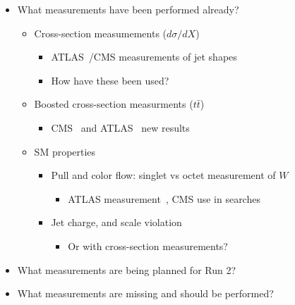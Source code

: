 \label{measurements}

\begin{itemize}
\item What measurements have been performed already?
\begin{itemize}
	\item Cross-section measumements ($d\sigma/ d X$)
	\begin{itemize}
		\item ATLAS~\cite{ATLAS-2010-Shapes}/CMS measurements of jet shapes
		\item How have these been used?
	\end{itemize}
	\item Boosted cross-section measurments ($t\bar{t}$)
	\begin{itemize}
		\item CMS~\cite{CMS-Top-Pt} and ATLAS~\cite{ATLAS-Top-Pt} new results
	\end{itemize}
	\item SM properties 
	\begin{itemize}
		\item Pull and color flow: singlet vs octet measurement of $W$
		\begin{itemize}
			\item ATLAS measurement~\cite{ATLAS-Color}, CMS use in searches~\cite{CMS-W,CMS-Higgs-bb}
		\end{itemize}
		\item Jet charge, and scale violation~\cite{ATLAS-Charge}
		\begin{itemize}
			\item Or with cross-section measurements?
		\end{itemize}
	\end{itemize}
\end{itemize}
\item What measurements are being planned for Run 2?
\item What measurements are missing and should be performed?
\end{itemize}